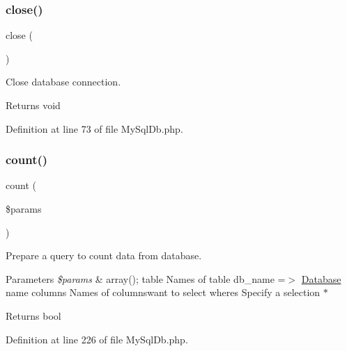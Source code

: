 \subsubsection{\texorpdfstring{close()}{close()}}
{\footnotesize\ttfamily close (\begin{DoxyParamCaption}{ }\end{DoxyParamCaption})}

Close database connection.

\begin{DoxyReturn}{Returns}
void 
\end{DoxyReturn}


Definition at line 73 of file My\+Sql\+Db.\+php.

\mbox{\label{class_zest_1_1_database_1_1_drives_1_1_m_y_s_q_l_1_1_my_sql_db_a47d80aeef2e59da428db2507a28a34ac}} 
\subsubsection{\texorpdfstring{count()}{count()}}
{\footnotesize\ttfamily count (\begin{DoxyParamCaption}\item[{}]{\$params }\end{DoxyParamCaption})}

Prepare a query to count data from database.


\begin{DoxyParams}{Parameters}
{\em \$params} & array(); \textquotesingle{}table\textquotesingle{} Names of table \textquotesingle{}db\+\_\+name\textquotesingle{} =$>$ \mbox{\hyperlink{namespace_zest_1_1_database}{Database}} name \textquotesingle{}columns\textquotesingle{} Names of columnswant to select \textquotesingle{}wheres\textquotesingle{} Specify a selection $\ast$\\
\hline
\end{DoxyParams}
\begin{DoxyReturn}{Returns}
bool 
\end{DoxyReturn}


Definition at line 226 of file My\+Sql\+Db.\+php.

